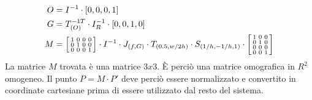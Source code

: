 \begin{equation}
    \begin{aligned}
        O & = I^{-1} \cdot [0, 0, 0, 1]                       \\
        G & = T_{(O)}^{-1T} \cdot I_R^{-1} \cdot [0, 0, 1, 0] \\
        M & =
        \begin{bsmallmatrix}
            1 & 0 & 0 & 0 \\
            0 & 1 & 0 & 0 \\
            0 & 0 & 0 & 1 \\
        \end{bsmallmatrix}
        \cdot I^{-1} \cdot J_{(f, G)} \cdot T_{(0.5, w/2h)} \cdot S_{(1/h, -1/h, 1)} \cdot
        \begin{bsmallmatrix}
            1 & 0 & 0 \\
            0 & 1 & 0 \\
            0 & 0 & 0 \\
            0 & 0 & 1 \\
        \end{bsmallmatrix}                                   \\
    \end{aligned}
\end{equation}
La matrice $M$ trovata è una matrice $3x3$.
È perciò una matrice omografica in $R^2$ omogeneo.
Il punto $P = M \cdot P'$ deve perciò essere normalizzato e convertito in coordinate cartesiane prima di essere utilizzato dal resto del sistema.
